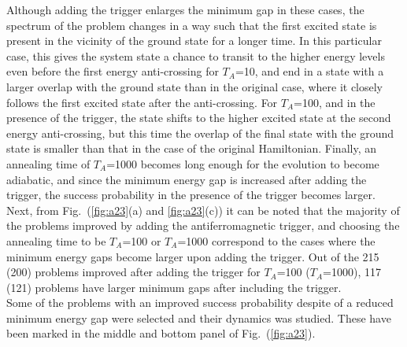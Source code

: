 \documentclass[../main.tex]{subfiles}
\begin{document}
Although adding the trigger enlarges the minimum gap in these cases, the spectrum of the problem changes in a way such that the first excited state is present in the vicinity of the ground state for a longer time. In this particular case, this gives the system state a chance to transit to the higher energy levels even before the first energy anti-crossing for $T_A$=10, and end in a state with a larger overlap with the ground state than in the original case, where it closely follows the first excited state after the anti-crossing. For $T_A$=100, and in the presence of the trigger, the state shifts to the higher excited state at the second energy anti-crossing, but this time the overlap of the final state with the ground state is smaller than that in the case of the original Hamiltonian. Finally, an annealing time of $T_A$=1000 becomes long enough for the evolution to become adiabatic, and since the minimum energy gap is increased after adding the trigger, the success probability in the presence of the trigger becomes larger.\\

Next, from Fig.~(\ref{fig:a23}(a) and \ref{fig:a23}(c)) it can be noted that the majority of the problems improved by adding the antiferromagnetic trigger, and choosing the annealing time to be $T_A$=100 or $T_A$=1000 correspond to the cases where the minimum energy gaps become larger upon adding the trigger. Out of the 215 (200) problems improved after adding the trigger for $T_A$=100 ($T_A$=1000), 117 (121) problems have larger minimum gaps after including the trigger.\\
Some of the problems with an improved success probability despite of a reduced minimum energy gap were selected and their dynamics was studied. These have been marked in the middle and bottom panel of Fig.~(\ref{fig:a23}). 
\end{document}
